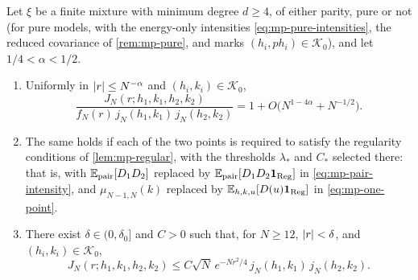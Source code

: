 \begin{theorem}\label{thm:mp-local-pair}
Let $\xi$ be a finite mixture with minimum degree $d\ge4$, of either parity, pure or not (for pure models, with the energy-only intensities \eqref{eq:mp-pure-intensities}, the reduced covariance of \cref{rem:mp-pure}, and marks $(h_i,ph_i)\in\mathcal K_0$), and let $1/4<\alpha<1/2$.
\begin{enumerate}[label=(\alph*)]
\item Uniformly in $\left|r\right|\le N^{-\alpha}$ and $(h_i,k_i)\in\mathcal K_0$,
\begin{equation}\label{eq:mp-factorization}
\frac{J_N(r;h_1,k_1,h_2,k_2)}{f_N(r)\,j_N(h_1,k_1)\,j_N(h_2,k_2)}=1+O\bigl(N^{1-4\alpha}+N^{-1/2}\bigr).
\end{equation}
\item The same holds if each of the two points is required to satisfy the regularity conditions of \cref{lem:mp-regular}, with the thresholds $\lambda_*$ and $C_*$ selected there: that is, with $\mathbb E_{\mathrm{pair}}[D_1D_2]$ replaced by $\mathbb E_{\mathrm{pair}}[D_1D_2\mathbf 1_{\mathrm{Reg}}]$ in \eqref{eq:mp-pair-intensity}, and $\mu_{N-1,N}(k)$ replaced by $\mathbb E_{h,k,u}[D(u)\mathbf 1_{\mathrm{Reg}}]$ in \eqref{eq:mp-one-point}.
\item There exist $\delta\in(0,\delta_0]$ and $C>0$ such that, for $N\ge12$, $\left|r\right|<\delta$, and $(h_i,k_i)\in\mathcal K_0$,
\begin{equation}\label{eq:mp-intermediate}
J_N(r;h_1,k_1,h_2,k_2)\le C\sqrt N\,e^{-Nr^2/4}\,j_N(h_1,k_1)\,j_N(h_2,k_2).
\end{equation}
\end{enumerate}
\end{theorem}

